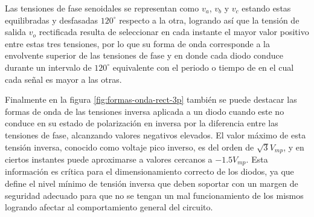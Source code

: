 Las tensiones de fase senoidales se representan como $v_a$, $v_b$ y $v_c$ estando estas equilibradas y desfasadas $120^\circ$ respecto a la otra, logrando así que la tensión de salida $v_o$ rectificada resulta de seleccionar en cada instante el mayor valor positivo entre estas tres tensiones, por lo que su forma de onda corresponde a la envolvente superior de las tensiones de fase y en donde cada diodo conduce durante un intervalo de $120^\circ$ equivalente con el periodo o tiempo de en el cual cada señal es mayor a las otras.

Finalmente en la figura \ref{fig:formas-onda-rect-3p} también se puede destacar las formas de onda de las tensiones inversa aplicada a un diodo cuando este no conduce en su estado de polarización en inversa por la diferencia entre las tensiones de fase, alcanzando valores negativos elevados. El valor máximo de esta tensión inversa, conocido como voltaje pico inverso, es del orden de $\sqrt{3}V_{mp}$, y en ciertos instantes puede aproximarse a valores cercanos a $-1.5V_{mp}$. Esta información es crítica para el dimensionamiento correcto de los diodos, ya que define el nivel mínimo de tensión inversa que deben soportar con un margen de seguridad adecuado para que no se tengan un mal funcionamiento de los mismos logrando afectar al comportamiento general del circuito.